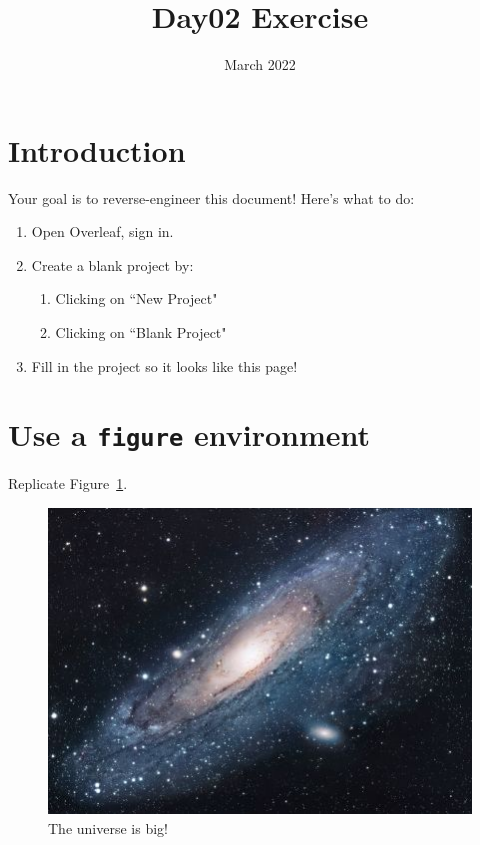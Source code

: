 \documentclass[twocolumn]{article}
\title{Day02 Exercise}
\date{March 2022}
\begin{document}
\maketitle

\section{Introduction} \label{sec:intro}

Your goal is to reverse-engineer this document! Here's what to do:

\begin{enumerate}
    \item Open Overleaf, sign in.
    \item Create a blank project by:
    \begin{enumerate}
        \item Clicking on ``New Project" 
        \item Clicking on ``Blank Project"
    \end{enumerate}
    \item Fill in the project so it looks like this page!
\end{enumerate}

\section{Use a \texttt{figure} environment} \label{sec:figure}

Replicate Figure~\ref{fig:universe}.

\begin{figure}[h]
    \centering
    \includegraphics[width=0.8\linewidth]{images/universe.jpg}
    \caption{The universe is big!}
    \label{fig:universe}
\end{figure}
\end{document}
